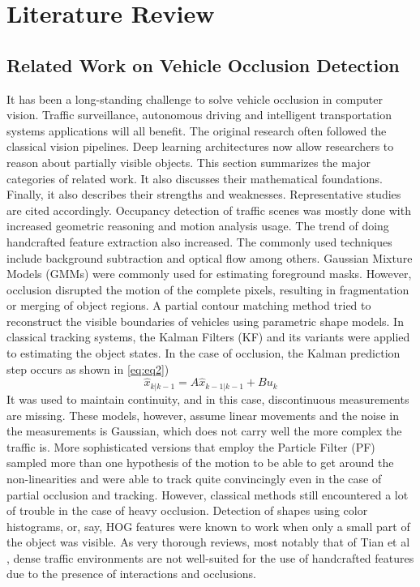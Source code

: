 \documentclass[12pt,a4paper]{report}
\theoremstyle{definition}
\theoremstyle{remark}
\begin{document}
\chapter{Literature Review}
\section{Related Work on Vehicle Occlusion Detection}
It has been a long-standing challenge to solve vehicle occlusion in computer vision. Traffic surveillance, autonomous driving and intelligent transportation systems applications will all benefit. The original research often followed the classical vision pipelines. Deep learning architectures now allow researchers to reason about partially visible objects. This section summarizes the major categories of related work. It also discusses their mathematical foundations. Finally, it also describes their strengths and weaknesses.  Representative studies are cited accordingly. Occupancy detection of traffic scenes was mostly done with increased geometric reasoning and motion analysis usage. The trend of doing handcrafted feature extraction also increased. The commonly used techniques include background subtraction and optical flow among others. Gaussian Mixture Models (GMMs) were commonly used for estimating foreground masks. However, occlusion disrupted the motion of the complete pixels, resulting in fragmentation or merging of object regions. A partial contour matching method tried to reconstruct the visible boundaries of vehicles using parametric shape models. In classical tracking systems, the Kalman Filters (KF) and its variants were applied to estimating the object states. In the case of occlusion, the Kalman prediction step occurs as shown in \ref{eq:eq2}) 
\begin{equation}
\label{eq:eq2}
\hat{x}_{k|k-1} = A \hat{x}_{k-1|k-1} + Bu_k
\end{equation}
It was used to maintain continuity, and in this case, discontinuous measurements are missing. These models, however, assume linear movements and the noise in the measurements is Gaussian, which does not carry well the more complex the traffic is. More sophisticated versions that employ the Particle Filter (PF) sampled more than one hypothesis of the motion to be able to get around the non-linearities and were able to track quite convincingly even in the case of partial occlusion and tracking. However, classical methods still encountered a lot of trouble in the case of heavy occlusion. Detection of shapes using color histograms, or, say, HOG features were known to work when only a small part of the object was visible. As very thorough reviews, most notably that of Tian et al \cite{paper17}, dense traffic environments are not well-suited for the use of handcrafted features due to the presence of interactions and occlusions.
\end{document}
